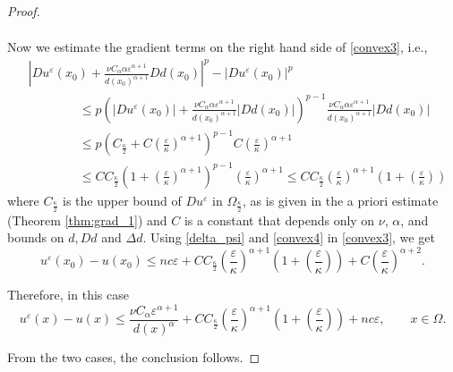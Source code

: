 \documentclass[12pt,reqno]{amsart}
\numberwithin{figure}{section}
\theoremstyle{plain}
\theoremstyle{remark}
\numberwithin{equation}{section}
\begin{document}
\begin{proof}
\begin{itemize}
\begin{align}
\end{align}
Now we estimate the gradient terms on the right hand side of \eqref{convex3}, i.e., 
\begin{align}\label{convex4}
    &\left|Du^\varepsilon(x_0) + \frac{\nu C_\alpha \alpha \varepsilon^{\alpha+1}}{d(x_0)^{\alpha+1}}D d(x_0)\right|^p - |Du^\varepsilon(x_0)|^p\nonumber \\
    &\qquad \qquad \leq p\left(|Du^\varepsilon(x_0)| + \frac{\nu C_\alpha \alpha \varepsilon^{\alpha+1}}{d(x_0)^{\alpha+1}}\left|D d(x_0)\right|\right)^{p-1} \frac{\nu C_\alpha \alpha \varepsilon^{\alpha+1}}{d(x_0)^{\alpha+1}}|D d(x_0)|\nonumber\\
    &\qquad \qquad \leq p\left(C_\frac{\kappa}{2} + C\left(\frac{\varepsilon}{\kappa}\right)^{\alpha+1}\right)^{p-1} C\left(\frac{\varepsilon}{\kappa}\right)^{\alpha+1}\nonumber\\
    &\qquad\qquad\leq CC_\frac{\kappa}{2}\left(1+\left(\frac{\varepsilon}{\kappa}\right)^{\alpha+1}\right)^{p-1} \left(\frac{\varepsilon}{\kappa}\right)^{\alpha+1} \leq CC_\frac{\kappa}{2} \left(\frac{\varepsilon}{\kappa}\right)^{\alpha+1}\left(1+ \left(\frac{\varepsilon}{\kappa}\right)\right)
\end{align}
where $C_\frac{\kappa}{2}$ is the upper bound of $Du^\varepsilon$ in $\Omega_\frac{\kappa}{2}$, as is given in the a priori estimate (Theorem \ref{thm:grad_1}) and $C$ is a constant that depends only on $\nu$, $\alpha$, and bounds on $d,Dd$ and $\Delta d$. Using \eqref{delta_psi} and \eqref{convex4} in \eqref{convex3}, we get
\begin{equation*}
    u^\varepsilon(x_0) - u(x_0) \leq nc\varepsilon + CC_\frac{\kappa}{2} \left(\frac{\varepsilon}{\kappa}\right)^{\alpha+1}\left(1+ \left(\frac{\varepsilon}{\kappa}\right)\right) + C\left(\frac{\varepsilon}{\kappa}\right)^{\alpha+2}.
\end{equation*}

Therefore, in this case 
\begin{equation*}
    u^\varepsilon(x) - u(x) \leq \frac{\nu C_\alpha \varepsilon^{\alpha+1}}{d(x)^\alpha} + CC_\frac{\kappa}{2} \left(\frac{\varepsilon}{\kappa}\right)^{\alpha+1}\left(1+ \left(\frac{\varepsilon}{\kappa}\right)\right) + nc\varepsilon, \qquad x\in \Omega.
\end{equation*}
\end{itemize}
From the two cases, the conclusion follows. 


\end{proof}
\end{document}
